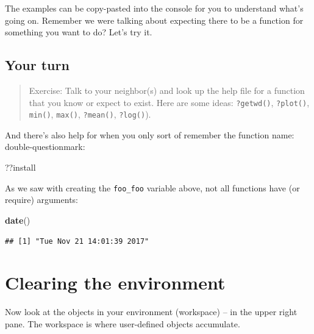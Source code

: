 \documentclass[]{book}
\newenvironment{Shaded}{\begin{snugshade}}{\end{snugshade}}
\newcommand{\KeywordTok}[1]{\textcolor[rgb]{0.13,0.29,0.53}{\textbf{{#1}}}}
\newcommand{\NormalTok}[1]{{#1}}
\theoremstyle{definition}
\theoremstyle{definition}
\theoremstyle{definition}
\theoremstyle{remark}
\begin{document}
The examples can be copy-pasted into the console for you to understand
what's going on. Remember we were talking about expecting there to be a
function for something you want to do? Let's try it.

\subsection{Your turn}\label{your-turn}

\begin{quote}
Exercise: Talk to your neighbor(s) and look up the help file for a
function that you know or expect to exist. Here are some ideas:
\texttt{?getwd()}, \texttt{?plot()}, \texttt{min()}, \texttt{max()},
\texttt{?mean()}, \texttt{?log()}).
\end{quote}

And there's also help for when you only sort of remember the function
name: double-questionmark:

\begin{Shaded}
\begin{Highlighting}[]
\NormalTok{??install }
\end{Highlighting}
\end{Shaded}

As we saw with creating the \texttt{foo\_foo} variable above, not all
functions have (or require) arguments:

\begin{Shaded}
\begin{Highlighting}[]
\KeywordTok{date}\NormalTok{()}
\end{Highlighting}
\end{Shaded}

\begin{verbatim}
## [1] "Tue Nov 21 14:01:39 2017"
\end{verbatim}

\section{Clearing the environment}\label{clearing-the-environment}

Now look at the objects in your environment (workspace) -- in the upper
right pane. The workspace is where user-defined objects accumulate.
\end{document}
